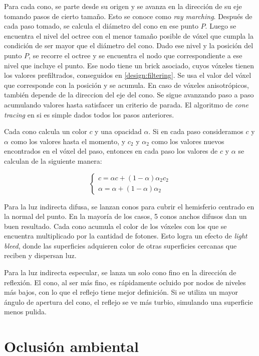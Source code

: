 Para cada cono, se parte desde su origen y se avanza en la dirección de su eje tomando pasos de cierto tamaño.
Esto se conoce como \textit{ray marching}. %
Después de cada paso tomado, se calcula el diámetro del cono en ese punto $P$.
Luego se encuentra el nivel del octree con el menor tamaño posible de vóxel que cumpla la condición de ser mayor que el diámetro del cono.
Dado ese nivel y la posición del punto $P$, se recorre el octree y se encuentra el nodo que correspondiente a ese nivel que incluye el punto.
Ese nodo tiene un brick asociado, cuyos vóxeles tienen los valores prefiltrados, conseguidos en \ref{design:filtering}.
Se usa el valor del vóxel que corresponde con la posición y se acumula. En caso de vóxeles anisotrópicos, también depende de la direccion del eje del cono.
Se sigue avanzando paso a paso acumulando valores hasta satisfacer un criterio de parada.
El algoritmo de \textit{cone tracing} en si es simple dados todos los pasos anteriores.

Cada cono calcula un color $c$ y una opacidad $\alpha$.
Si en cada paso consideramos $c$ y $\alpha$ como los valores hasta el momento, y $c_2$ y $\alpha_2$ como los valores nuevos encontrados en el vóxel del paso, entonces en cada paso los valores de $c$ y $\alpha$ se calculan de la siguiente manera:

$$
\begin{cases}
    c = \alpha c + (1 - \alpha) \alpha_2 c_2 \\
    \alpha = \alpha + (1 - \alpha) \alpha_2
\end{cases}
$$

Para la luz indirecta difusa, se lanzan conos para cubrir el hemisferio centrado en la normal del punto.
En la mayoría de los casos, 5 conos anchos difusos dan un buen resultado.
Cada cono acumula el color de los vóxeles con los que se encuentra multiplicado por la cantidad de fotones.
Esto logra un efecto de \textit{light bleed}, donde las superficies adquieren color de otras superficies cercanas que reciben y dispersan luz.

Para la luz indirecta especular, se lanza un solo cono fino en la dirección de reflexión.
El cono, al ser más fino, es rápidamente ocluido por nodos de niveles más bajos, con lo que el reflejo tiene mejor definición.
Si se utiliza un mayor ángulo de apertura del cono, el reflejo se ve más turbio, simulando una superficie menos pulida.

\section{Oclusión ambiental}

